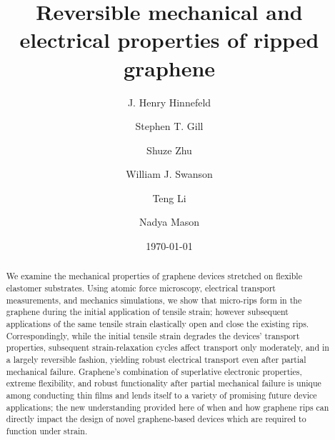 \documentclass[%
 aps,
 pra,
 longbibliography,
 amsmath,amssymb,
 reprint,
 superscriptaddress,
]{revtex4-1}
\begin{document}
\title[Reversible mechanical and electrical properties of ripped graphene]{Reversible mechanical and electrical properties of ripped graphene}

\author{J. Henry Hinnefeld}
\author{Stephen T. Gill}
\author{Shuze Zhu}
\author{William J. Swanson}
\author{Teng Li}
\author{Nadya Mason}

\date{\today}

\begin{abstract}
We examine the mechanical properties of graphene devices stretched on flexible
elastomer substrates. Using atomic force microscopy, electrical transport
measurements, and mechanics simulations, we show that micro-rips form in the
graphene during the initial application of tensile strain; however subsequent
applications of the same tensile strain elastically open and close the existing
rips. Correspondingly, while the initial tensile strain degrades the devices'
transport properties, subsequent strain-relaxation cycles affect transport only
moderately, and in a largely reversible fashion, yielding robust electrical
transport even after partial mechanical failure. Graphene's combination of
superlative electronic properties, extreme flexibility, and robust
functionality after partial mechanical failure is unique among conducting thin
films and lends itself to a variety of promising future device applications;
the new understanding provided here of when and how graphene rips can directly
impact the design of novel graphene-based devices which are required to
function under strain.
\end{abstract}

\maketitle
\end{document}
